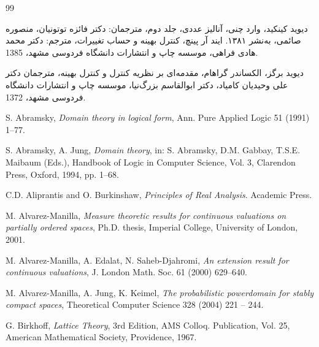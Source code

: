 \normalsize
\small

\begin{thebibliography}{99}

دیوید کینکید، وارد چنی، آنالیز عددی، جلد دوم، مترجمان: دکتر فائزه توتونیان، منصوره صائمی، به‌نشر ۱۳۸۱.
ایند آر پینچ، کنترل بهینه و حساب تغییرات، مترجم: دکتر محمد هادی فراهی، موسسه چاپ و انتشارات دانشگاه فردوسی مشهد، 1385.

دیوید برگز، الکساندر گراهام، مقدمه‌ای بر نظریه کنترل و کنترل بهینه، مترجمان دکتر علی وحیدیان کامیاد، دکتر ابوالقاسم بزرگ‌نیا، موسسه چاپ و انتشارات دانشگاه فردوسی مشهد، 1372.
\begin{LTR}
\resetlatinfont

S. Abramsky, {\em Domain theory in logical form}, Ann. Pure Applied Logic 51 (1991) 1–77.

S. Abramsky, A. Jung, {\em Domain theory}, in: S. Abramsky, D.M. Gabbay, T.S.E. Maibaum (Eds.), Handbook of
Logic in Computer Science, Vol. 3, Clarendon Press, Oxford, 1994, pp. 1–68.

C.D. Aliprantis and O. Burkinshaw,   {\em Principles of Real Analysis}.  Academic Press.

M. Alvarez-Manilla, {\em Measure theoretic results for continuous valuations on partially ordered spaces}, Ph.D.
thesis, Imperial College, University of London, 2001.

M. Alvarez-Manilla, A. Edalat, N. Saheb-Djahromi, {\em An extension result for continuous valuations}, J. London
Math. Soc. 61 (2000) 629–640.

M. Alvarez-Manilla, A. Jung, K. Keimel, {\em The probabilistic powerdomain for stably compact
spaces}, Theoretical Computer Science 328 (2004) 221 – 244.

G. Birkhoff, {\em Lattice Theory}, 3rd Edition, AMS Colloq. Publication, Vol. 25, American Mathematical Society,
Providence, 1967.


\end{LTR}
\end{thebibliography}
